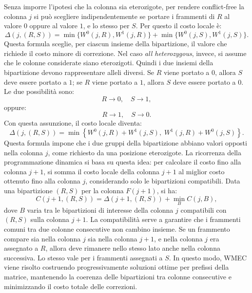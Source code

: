 Senza imporre l'ipotesi che la colonna sia eterozigote, per rendere conflict-free la colonna \(j\) si può scegliere 
indipendentemente se portare i frammenti di \(R\) al valore \(0\) oppure al valore \(1\), e 
lo stesso per \(S\). Per questo il costo locale è:
\[
\Delta(j,(R,S))
=
\min\{W^0(j,R),W^1(j,R)\}
+
\min\{W^0(j,S),W^1(j,S)\}.
\]
Questa formula sceglie, per ciascun insieme della bipartizione, il valore che richiede il costo minore di correzione.
Nel caso \emph{all heterozygous}, invece, si assume che le colonne considerate siano eterozigoti. 
Quindi i due insiemi della bipartizione devono rappresentare alleli diversi. 
Se \(R\) viene portato a \(0\), allora \(S\) deve essere portato a \(1\); se \(R\) viene portato a \(1\), 
allora \(S\) deve essere portato a \(0\). Le due possibilità sono:
\[
R \to 0,\quad S \to 1,
\]
oppure:
\[
R \to 1,\quad S \to 0.
\]
Con questa assunzione, il costo locale diventa:
\[
\Delta(j,(R,S))
=
\min
\left\{
W^0(j,R)+W^1(j,S),
\;
W^1(j,R)+W^0(j,S)
\right\}.
\]
Questa formula impone che i due gruppi della bipartizione abbiano valori opposti nella colonna \(j\), come richiesto da una posizione eterozigote.
La ricorrenza della programmazione dinamica si basa su questa idea: per calcolare il costo fino alla colonna \(j+1\), si somma il costo locale della colonna \(j+1\) al miglior costo ottenuto fino alla colonna \(j\), considerando solo le bipartizioni compatibili. Data una bipartizione \((R,S)\) per la colonna \(F(j+1)\), si ha:
\[
C(j+1,(R,S))
=
\Delta(j+1,(R,S))
+
\min_B C(j,B),
\]
dove \(B\) varia tra le bipartizioni di interesse della colonna \(j\) compatibili con \((R,S)\) sulla colonna \(j+1\).
La compatibilità serve a garantire che i frammenti comuni tra due colonne consecutive non cambino insieme. Se un frammento compare sia nella colonna \(j\) sia nella colonna \(j+1\), e nella colonna \(j\) era assegnato a \(R\), allora deve rimanere nello stesso lato anche nella colonna successiva. Lo stesso vale per i frammenti assegnati a \(S\).
In questo modo, WMEC viene risolto costruendo progressivamente soluzioni ottime per prefissi della matrice, mantenendo la coerenza delle bipartizioni tra colonne consecutive e minimizzando il costo totale delle correzioni.